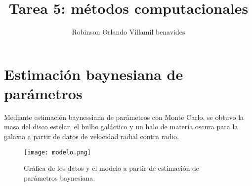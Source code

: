 \documentclass[a4paper]{article}
\title{Tarea 5: métodos computacionales}
\author{Robinson Orlando Villamil benavides}
\begin{document}
\maketitle



\section{Estimación baynesiana de parámetros}
Mediante estimación baynessiana de parámetros con Monte Carlo, se obtuvo la masa del disco estelar, el bulbo galáctico y un halo de materia oscura para la galaxia a partir de datos de velocidad radial contra radio.



\begin{figure}[!h]
\texttt{[image: modelo.png]}
\caption{\label{fig:01} Gráfica de los datos y el modelo a partir de estimación de parámetros baynesiana. }
\end{figure}
\newpage
\end{document}
